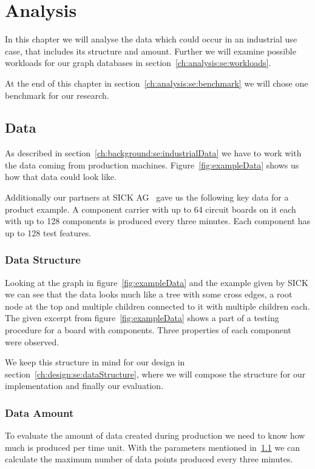 \chapter{Analysis}
\label{ch:analysis}
In this chapter we will analyse the data which could occur in an industrial use case,
that includes its structure and amount.
Further we will examine possible workloads for our graph databases in section~\ref{ch:analysis:se:workloads}.

At the end of this chapter in section~\ref{ch:analysis:se:benchmark} we will chose one benchmark for our research.

\section{Data}
\label{ch:analysis:se:data}
As described in section~\ref{ch:background:se:industrialData} we have to work with the data coming from production machines.
Figure~\ref{fig:exampleData} shows us how that data could look like.

Additionally our partners at SICK AG~\cite{SICK} gave us the following key data for a product example.
A component carrier with up to 64 circuit boards on it each with up to 128 components is produced every three minutes.
Each component has up to 128 test features.

\subsection{Data Structure}
Looking at the graph in figure~\ref{fig:exampleData} and the example given by SICK we can see that the data looks much like a tree with some cross edges,
a root node at the top and multiple children connected to it with multiple children each.
The given excerpt from figure~\ref{fig:exampleData} shows a part of a testing procedure for a board with components.
Three properties of each component were observed.

We keep this structure in mind for our design in section~\ref{ch:design:se:dataStructure},
where we will compose the structure for our implementation and finally our evaluation.

\subsection{Data Amount}
\label{ch:analysis:se:dataAmount}
To evaluate the amount of data created during production we need to know how much is produced per time unit.
With the parameters mentioned in~\ref{ch:analysis:se:data} we can calculate the maximum number of data points produced every three minutes.

